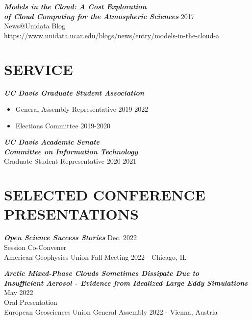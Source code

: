 \documentclass[overlapped]{res}
\begin{document}
\begin{resume}
    {\sl \textbf{Models in the Cloud: A Cost Exploration \\ of Cloud Computing for the Atmospheric Sciences}} \hfill 2017 \\
    News@Unidata Blog \\
    \href{https://www.unidata.ucar.edu/blogs/news/entry/models-in-the-cloud-a}{https://www.unidata.ucar.edu/blogs/news/entry/models-in-the-cloud-a}
    
    
    \section{SERVICE}
    {\sl \textbf{UC Davis Graduate Student Association}} \\

    \begin{itemize}
        \item General Assembly Representative \hfill 2019-2022
        \item Elections Committee \hfill 2019-2020
    \end{itemize} 
    \newpage
    {\sl \textbf{UC Davis Academic Senate \\ Committee on Information Technology}} \\
    Graduate Student Representative \hfill 2020-2021


\section{SELECTED CONFERENCE PRESENTATIONS}

    {\sl \textbf{Open Science Success Stories}} \hfill Dec. 2022 \\
    Session Co-Convener \\
    American Geophysics Union Fall Meeting 2022 - Chicago, IL

    {\sl \textbf{Arctic Mixed-Phase Clouds Sometimes Dissipate Due to \\ Insufficient Aerosol - Evidence from Idealized Large Eddy Simulations}} \hfill May 2022 \\ 
    Oral Presentation \\
    European Geosciences Union General Assembly 2022 - Vienna, Austria
    

\end{resume}
\end{document}
